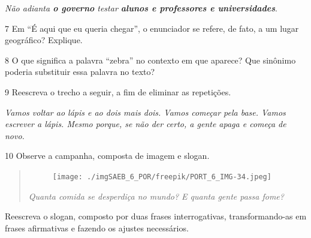 \smallskip

\noindent\small\emph{Não adianta \textbf{o governo} testar \textbf{alunos e professores e
universidades}}.

\normalsize


\num{7} Em ``É aqui que eu queria chegar'', o enunciador se refere, de
fato, a um lugar geográfico? Explique.


\num{8} O que significa a palavra ``zebra'' no contexto em que aparece?
Que sinônimo poderia substituir essa palavra no texto?


\num{9} Reescreva o trecho a seguir, a fim de eliminar as repetições.

\smallskip

\noindent\small\emph{Vamos voltar ao lápis e ao dois mais dois. Vamos começar pela base.
Vamos escrever a lápis. Mesmo porque, se não der certo, a gente apaga e
começa de novo.}

\normalsize


\num{10} Observe a campanha, composta de imagem e slogan.

\begin{quote}
\begin{figure}[H]
\centering\texttt{[image: ./imgSAEB\_6\_POR/freepik/PORT\_6\_IMG-34.jpeg]}
\end{figure}

\centering\emph{Quanta comida se desperdiça no mundo? E quanta gente passa fome?}
\end{quote}

\noindent Reescreva o slogan, composto por duas frases interrogativas,
transformando-as em frases afirmativas e fazendo os ajustes necessários.


